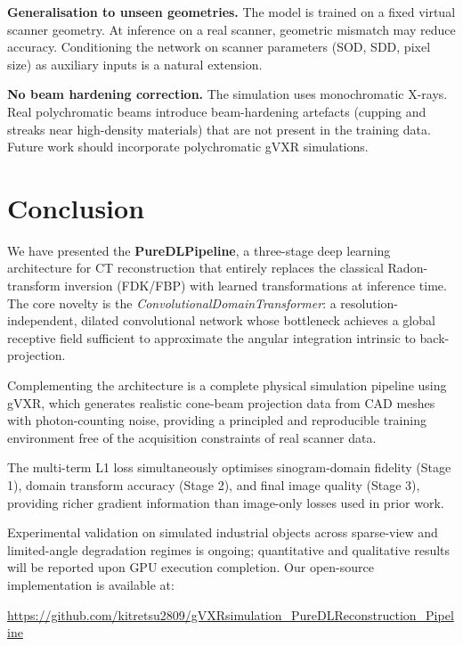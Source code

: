 \documentclass[10pt,twocolumn]{article}
\begin{document}
\textbf{Generalisation to unseen geometries.}
The model is trained on a fixed virtual scanner geometry.
At inference on a real scanner, geometric mismatch may reduce
accuracy.
Conditioning the network on scanner parameters (SOD, SDD, pixel
size) as auxiliary inputs is a natural extension.

\textbf{No beam hardening correction.}
The simulation uses monochromatic X-rays.
Real polychromatic beams introduce beam-hardening artefacts
(cupping and streaks near high-density materials) that are not
present in the training data.
Future work should incorporate polychromatic gVXR simulations.

\section{Conclusion}
\label{sec:conclusion}

We have presented the \textbf{PureDLPipeline}, a three-stage deep
learning architecture for CT reconstruction that entirely replaces
the classical Radon-transform inversion (FDK/FBP) with learned
transformations at inference time.
The core novelty is the \textit{ConvolutionalDomainTransformer}:
a resolution-independent, dilated convolutional network whose
bottleneck achieves a global receptive field sufficient to
approximate the angular integration intrinsic to back-projection.

Complementing the architecture is a complete physical simulation
pipeline using gVXR, which generates realistic cone-beam projection
data from CAD meshes with photon-counting noise, providing a
principled and reproducible training environment free of the
acquisition constraints of real scanner data.

The multi-term L1 loss simultaneously optimises sinogram-domain
fidelity (Stage 1), domain transform accuracy (Stage 2), and
final image quality (Stage 3), providing richer gradient information
than image-only losses used in prior work.

Experimental validation on simulated industrial objects across
sparse-view and limited-angle degradation regimes is ongoing;
quantitative and qualitative results will be reported upon GPU
execution completion.
Our open-source implementation is available at:
\begin{center}
\small\url{https://github.com/kitretsu2809/gVXRsimulation_PureDLReconstruction_Pipeline}
\end{center}
\end{document}
